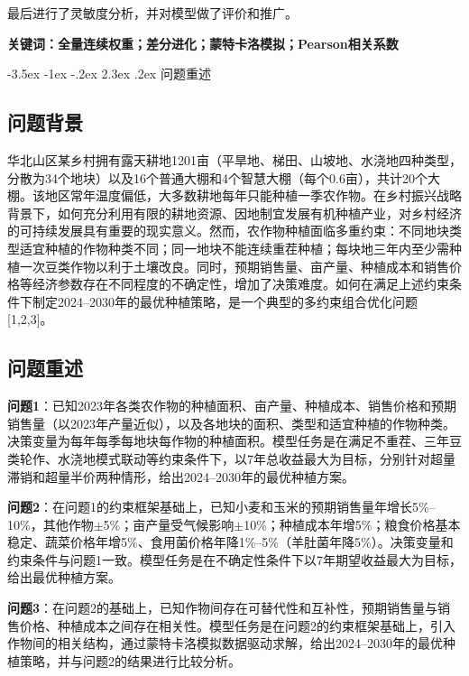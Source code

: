 \documentclass[12pt,a4paper]{article}
\makeatletter
\renewcommand\section{\@startsection{section}{1}{\z@}%
  {-3.5ex \@plus -1ex \@minus -.2ex}%
  {2.3ex \@plus .2ex}%
  {\centering\normalfont\Large\bfseries}}
\makeatother
\begin{document}
最后进行了灵敏度分析，并对模型做了评价和推广。

\vspace{2ex}
\textbf{关键词：全量连续权重；差分进化；蒙特卡洛模拟；Pearson相关系数} 


\clearpage

\section{问题重述}

\subsection{问题背景}

华北山区某乡村拥有露天耕地1201亩（平旱地、梯田、山坡地、水浇地四种类型，分散为34个地块）以及16个普通大棚和4个智慧大棚（每个0.6亩），共计20个大棚。该地区常年温度偏低，大多数耕地每年只能种植一季农作物。在乡村振兴战略背景下，如何充分利用有限的耕地资源、因地制宜发展有机种植产业，对乡村经济的可持续发展具有重要的现实意义。然而，农作物种植面临多重约束：不同地块类型适宜种植的作物种类不同；同一地块不能连续重茬种植；每块地三年内至少需种植一次豆类作物以利于土壤改良。同时，预期销售量、亩产量、种植成本和销售价格等经济参数存在不同程度的不确定性，增加了决策难度。如何在满足上述约束条件下制定2024--2030年的最优种植策略，是一个典型的多约束组合优化问题[1,2,3]。

\subsection{问题重述}

\textbf{问题1}：已知2023年各类农作物的种植面积、亩产量、种植成本、销售价格和预期销售量（以2023年产量近似），以及各地块的面积、类型和适宜种植的作物种类。决策变量为每年每季每地块每作物的种植面积。模型任务是在满足不重茬、三年豆类轮作、水浇地模式联动等约束条件下，以7年总收益最大为目标，分别针对超量滞销和超量半价两种情形，给出2024--2030年的最优种植方案。

\textbf{问题2}：在问题1的约束框架基础上，已知小麦和玉米的预期销售量年增长5\%--10\%，其他作物$\pm$5\%；亩产量受气候影响$\pm$10\%；种植成本年增5\%；粮食价格基本稳定、蔬菜价格年增5\%、食用菌价格年降1\%--5\%（羊肚菌年降5\%）。决策变量和约束条件与问题1一致。模型任务是在不确定性条件下以7年期望收益最大为目标，给出最优种植方案。

\textbf{问题3}：在问题2的基础上，已知作物间存在可替代性和互补性，预期销售量与销售价格、种植成本之间存在相关性。模型任务是在问题2的约束框架基础上，引入作物间的相关结构，通过蒙特卡洛模拟数据驱动求解，给出2024--2030年的最优种植策略，并与问题2的结果进行比较分析。
\end{document}
